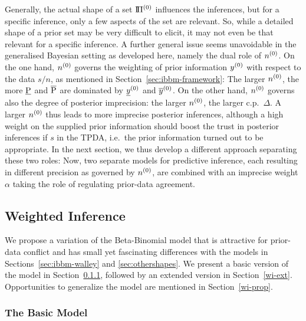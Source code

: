 Generally, the actual shape of a set $\text{I}\!\Pi^{(0)}$ influences the inferences,
but for a specific inference, only a few aspects of the set are relevant. So, while
a detailed shape of a prior set may be very difficult to elicit, it may not
even be that relevant for a specific inference. A further general issue seems unavoidable in the
generalised Bayesian setting as developed here, namely the dual role of $n^{(0)}$. On the one
hand, $n^{(0)}$ governs the weighting of prior information $y^{(0)}$ with
respect to the data $s/n$, as mentioned in
Section~\ref{sec:ibbm-framework}: The larger $n^{(0)}$, the more
$\underline{\operatorname{P}}$ and $\overline{\operatorname{P}}$ are dominated by $\underline{y}^{(0)}$ and $\overline{y}^{(0)}$. On
the other hand, $n^{(0)}$ governs also the degree of posterior
imprecision: the larger $n^{(0)}$, the larger c.p.\ $\Delta$. A larger
$n^{(0)}$ thus leads to more imprecise posterior inferences, although a
high weight on the supplied prior information should boost the trust
in posterior inferences if $s$ in the TPDA, i.e.\ the prior
information turned out to be appropriate. In the next section,
we thus develop a different approach separating these two
roles: Now, two separate models for predictive inference, each
resulting in different precision as governed by $n^{(0)}$,
are combined with an imprecise weight $\alpha$ %
taking the role of regulating prior-data agreement.


\subsection{Weighted Inference}
\label{sec:weightedinf}

We propose a variation of the Beta-Binomial model
that is attractive for prior-data conflict
and has small yet fascinating differences with the models in
Sections~\ref{sec:ibbm-walley} and \ref{sec:othershapes}. We present a basic
version of the model in Section~\ref{wi-basic}, followed by an
extended version in Section~\ref{wi-ext}. Opportunities to
generalize the model are mentioned in
Section~\ref{wi-prop}.


\subsubsection{The Basic Model}
\label{wi-basic}

